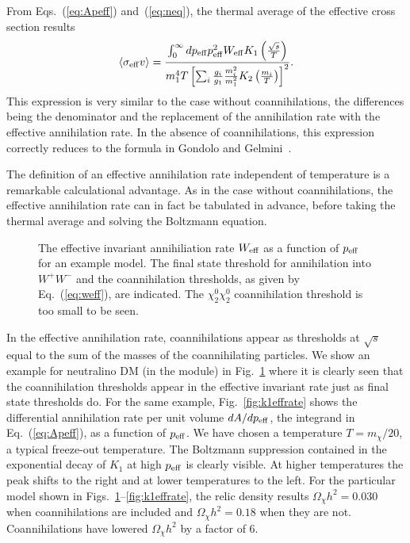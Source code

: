 {}From Eqs.~(\ref{eq:Apeff}) and~(\ref{eq:neq}), the thermal average of
the effective cross section results
\begin{equation} \label{eq:sigmavefffin2}
  \langle \sigma_{\rm{eff}}v \rangle = \frac{\int_0^\infty
  dp_{\rm{eff}} p_{\rm{eff}}^2 W_{\rm{eff}} K_1 \left(
  \frac{\sqrt{s}}{T} \right) } { m_1^4 T \left[ \sum_i \frac{g_i}{g_1}
  \frac{m_i^2}{m_1^2} K_2 \left(\frac{m_i}{T}\right) \right]^2}.
\end{equation}
This expression is very similar to the case without coannihilations,
the differences being the denominator and the replacement of the
annihilation rate with the effective annihilation rate. 
In the absence of coannihilations, this expression
correctly reduces to the formula in Gondolo and
Gelmini~\cite{Gondolo:1990dk}.

The definition of an effective annihilation rate independent of
temperature is a remarkable calculational advantage. As in the case
without coannihilations, the effective annihilation rate can in fact
be tabulated in advance, before taking the thermal average and
solving the Boltzmann equation.

\begin{figure}
  \centerline{}
  \caption{The effective invariant annihiliation rate $W_{\rm eff}$
    as a function of $p_{\rm eff}$ for an example  model. 
    The final state threshold for
    annihilation into $W^+ W^-$ and the coannihilation thresholds, as
    given by Eq.~(\protect\ref{eq:weff}), are indicated.  
    The $\chi_2^0 \chi_2^0$ coannihilation threshold is too small to
    be seen.}
  \label{fig:effrate}
\end{figure}

In the effective annihilation rate, coannihilations appear
as thresholds at $\sqrt{s}$ equal to the sum of the masses of the
coannihilating particles.  We show an example for neutralino
DM (in the  module) in
Fig.~\ref{fig:effrate} where it is clearly seen that the
coannihilation thresholds appear in the effective invariant rate
just as final state thresholds do.  For the same example,
Fig.~\ref{fig:k1effrate} shows the differential annihilation rate
per unit volume $dA/dp_{\rm eff}$, the integrand in
Eq.~(\ref{eq:Apeff}), as a function of $p_{\rm eff}$. We have
chosen a temperature $T=m_{\chi}/20$, a typical freeze-out
temperature. The Boltzmann suppression contained in the exponential
decay of $K_{1}$ at high $p_{\rm eff}$ is clearly visible.  At
higher temperatures the peak shifts to the right and at lower
temperatures to the left.  For the particular model shown in
Figs.~\ref{fig:effrate}--\ref{fig:k1effrate}, the relic density
results $\Omega_\chi h^2=0.030$ when coannihilations are included
and $\Omega_\chi h^2=0.18$ when they are not. Coannihilations
have lowered $\Omega_\chi h^2$ by a factor of 6.

